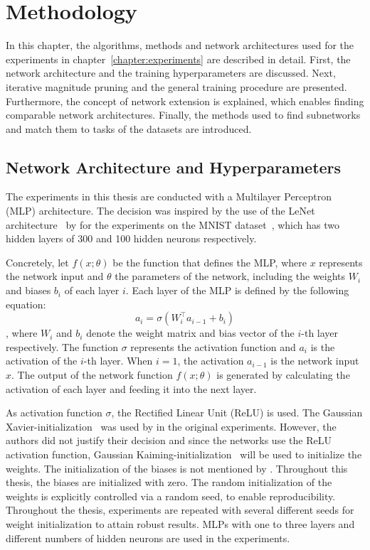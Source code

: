 \chapter{Methodology}\label{chapter:method} 
In this chapter, the algorithms, methods and network architectures used for the experiments in chapter~\ref{chapter:experiments} are described in detail.
First, the network architecture and the training hyperparameters are discussed.
Next, iterative magnitude pruning and the general training procedure are presented.
Furthermore, the concept of network extension is explained, which enables finding comparable network architectures.
Finally, the methods used to find subnetworks and match them to tasks of the datasets are introduced. 

\section{Network Architecture and Hyperparameters}
The experiments in this thesis are conducted with a Multilayer Perceptron (MLP) architecture.
The decision was inspired by the use of the LeNet architecture~\autocite{cnn} by \textcite{LTH} for the experiments on the MNIST dataset~\autocite{mnist}, which has two hidden layers of 300 and 100 hidden neurons respectively.

Concretely, let $f(x; \theta)$ be the function that defines the MLP, where $x$ represents the network input and $\theta$ the parameters of the network, including the weights $W_i$ and biases $b_i$ of each layer $i$.
Each layer of the MLP is defined by the following equation:
\[ a_i = \sigma(W_i^\top a_{i-1} + b_{i}) \]
, where $W_i$ and $b_i$ denote the weight matrix and bias vector of the $i$-th layer respectively.
The function $\sigma$ represents the activation function and $a_i$ is the activation of the $i$-th layer.
When $i=1$, the activation $a_{i-1}$ is the network input $x$.
The output of the network function $f(x; \theta)$ is generated by calculating the activation of each layer and feeding it into the next layer.

As activation function $\sigma$, the Rectified Linear Unit (ReLU) is used.
The Gaussian Xavier-initialization~\autocite{XAVIER-GLOROT} was used by \textcite{LTH} in the original experiments.
However, the authors did not justify their decision and since the networks use the ReLU activation function, Gaussian Kaiming-initialization~\autocite{KAIMING-HE} will be used to initialize the weights.
The initialization of the biases is not mentioned by \textcite{LTH}.
Throughout this thesis, the biases are initialized with zero.
The random initialization of the weights is explicitly controlled via a random seed, to enable reproducibility.
Throughout the thesis, experiments are repeated with several different seeds for weight initialization to attain robust results. 
MLPs with one to three layers and different numbers of hidden neurons are used in the experiments.

